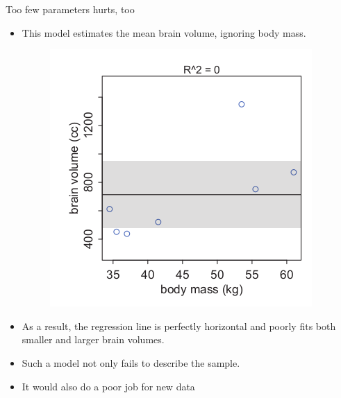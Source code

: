 \documentclass[handout]{beamer}
\begin{document}
\begin{frame}[fragile]{Too few parameters hurts, too}
\scriptsize{

\begin{itemize}


\item This model estimates the mean brain volume, ignoring body mass.


\begin{figure}[h!]
	\centering
	\includegraphics[scale=0.41]{pics/regconstant.png}
\end{figure}

\item As a result, the regression line is perfectly horizontal and poorly fits both smaller and larger brain volumes.

\item Such a model not only fails to describe the sample.

\item It would also do a poor job for new data

\end{itemize}


} 
\end{frame}
\end{document}
